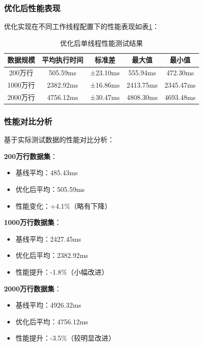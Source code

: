 \subsubsection{优化后性能表现}

优化实现在不同工作线程配置下的性能表现如表\ref{tab:optimized_performance}：

\begin{table}[htbp]
\centering
\caption{优化后单线程性能测试结果}
\label{tab:optimized_performance}
\begin{tabular}{|c|c|c|c|c|}
\hline
数据规模 & 平均执行时间 & 标准差 & 最大值 & 最小值 \\
\hline
200万行 & 505.59ms & ±23.10ms & 555.94ms & 472.30ms \\
1000万行 & 2382.92ms & ±16.86ms & 2413.75ms & 2345.47ms \\
2000万行 & 4756.12ms & ±30.47ms & 4808.30ms & 4693.48ms \\
\hline
\end{tabular}
\end{table}

\subsubsection{性能对比分析}

基于实际测试数据的性能对比分析：

\textbf{200万行数据集}：
\begin{itemize}
    \item 基线平均：485.43ms
    \item 优化后平均：505.59ms
    \item 性能变化：+4.1\%（略有下降）
\end{itemize}

\textbf{1000万行数据集}：
\begin{itemize}
    \item 基线平均：2427.45ms
    \item 优化后平均：2382.92ms
    \item 性能提升：-1.8\%（小幅改进）
\end{itemize}

\textbf{2000万行数据集}：
\begin{itemize}
    \item 基线平均：4926.32ms
    \item 优化后平均：4756.12ms
    \item 性能提升：-3.5\%（较明显改进）
\end{itemize}


